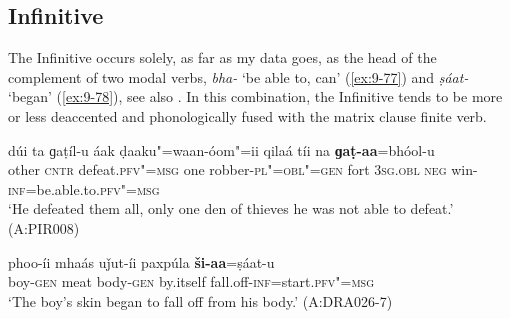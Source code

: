 \subsection{Infinitive}
\label{subsec:9-3-6}

The Infinitive occurs solely, as far as my data goes, as the head of the complement of two modal
verbs, \textit{bha-} `be able to, can' (\ref{ex:9-77}) and \textit{ṣáat-} `began' (\ref{ex:9-78}), see also
. In this combination, the Infinitive tends to be more or less deaccented and phonologically fused with the matrix clause finite verb.

\begin{exe}
\ex
\label{ex:9-77}
\gll dúi ta ɡaṭíl-u áak ḍaaku"=waan-óom"=ii qilaá tíi na \textbf{ɡaṭ-aa}=bhóol-u  \\
other \textsc{cntr} defeat.\textsc{pfv"=msg} one robber-\textsc{pl"=obl"=gen}  fort \textsc{3sg.obl} \textsc{neg} win-\textsc{inf}=be.able.to.\textsc{pfv"=msg} \\
\glt `He defeated them all, only one den of thieves he was not able to defeat.' (A:PIR008)

\ex
\label{ex:9-78}
\gll phoo-íi mhaás uǰut-íi paxpúla \textbf{ši-aa}=ṣáat-u \\
boy-\textsc{gen} meat body-\textsc{gen} by.itself fall.off-\textsc{inf}=start.\textsc{pfv"=msg} \\
\glt `The boy's skin began to fall off from his body.' (A:DRA026-7) 
\end{exe}
